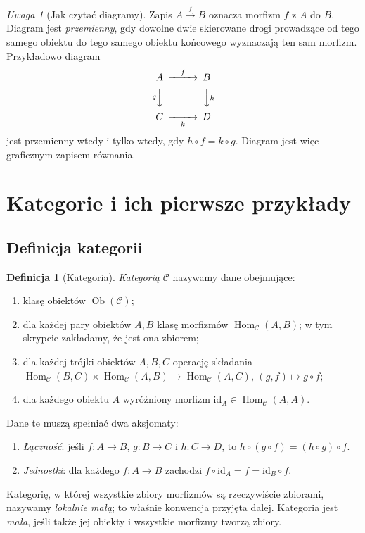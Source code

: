 \documentclass[11pt,a4paper]{article}
\numberwithin{equation}{section}
\theoremstyle{plain}
\theoremstyle{definition}
\newtheorem{definicja}[twierdzenie]{Definicja}
\theoremstyle{remark}
\newtheorem{uwaga}[twierdzenie]{Uwaga}
\newcommand{\id}{\mathrm{id}}
\newcommand{\Hom}{\operatorname{Hom}}
\newcommand{\Ob}{\operatorname{Ob}}
\begin{document}
\begin{uwaga}[Jak czytać diagramy]
Zapis $A\xrightarrow{f}B$ oznacza morfizm $f$ z $A$ do $B$. Diagram jest \emph{przemienny}, gdy dowolne dwie skierowane drogi prowadzące od tego samego obiektu do tego samego obiektu końcowego wyznaczają ten sam morfizm. Przykładowo diagram
\[
\begin{CD}
A @>f>> B\\
@VgVV @VVhV\\
C @>>k> D
\end{CD}
\]
jest przemienny wtedy i tylko wtedy, gdy $h\circ f=k\circ g$. Diagram jest więc graficznym zapisem równania.
\end{uwaga}

\section{Kategorie i ich pierwsze przykłady}\label{sec:kategorie}

\subsection{Definicja kategorii}

\begin{definicja}[Kategoria]\label{def:kategoria}
\emph{Kategorią} $\mathcal C$ nazywamy dane obejmujące:
\begin{enumerate}
\item klasę obiektów $\Ob(\mathcal C)$;
\item dla każdej pary obiektów $A,B$ klasę morfizmów $\Hom_{\mathcal C}(A,B)$; w tym skrypcie zakładamy, że jest ona zbiorem;
\item dla każdej trójki obiektów $A,B,C$ operację składania
$\Hom_{\mathcal C}(B,C)\times\Hom_{\mathcal C}(A,B)\to\Hom_{\mathcal C}(A,C)$, $(g,f)\mapsto g\circ f$;
\item dla każdego obiektu $A$ wyróżniony morfizm $\id_A\in\Hom_{\mathcal C}(A,A)$.
\end{enumerate}
Dane te muszą spełniać dwa aksjomaty:
\begin{enumerate}[label=(\roman*)]
\item \emph{Łączność}: jeśli $f:A\to B$, $g:B\to C$ i $h:C\to D$, to $h\circ(g\circ f)=(h\circ g)\circ f$.
\item \emph{Jednostki}: dla każdego $f:A\to B$ zachodzi $f\circ\id_A=f=\id_B\circ f$.
\end{enumerate}
Kategorię, w której wszystkie zbiory morfizmów są rzeczywiście zbiorami, nazywamy \emph{lokalnie małą}; to właśnie konwencja przyjęta dalej. Kategoria jest \emph{mała}, jeśli także jej obiekty i wszystkie morfizmy tworzą zbiory.
\end{definicja}
\end{document}
